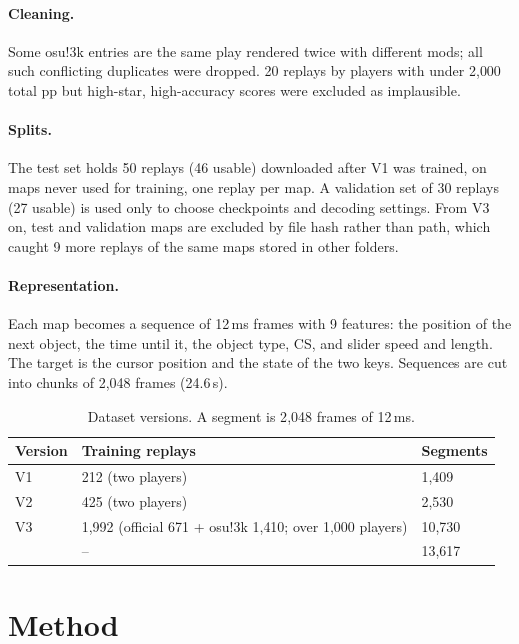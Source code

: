 \documentclass[11pt,a4paper]{article}
\begin{document}
\paragraph{Cleaning.} Some osu!3k entries are the same play rendered twice with different mods; all such
conflicting duplicates were dropped. 20 replays by players with under 2{,}000 total pp but high-star,
high-accuracy scores were excluded as implausible.

\paragraph{Splits.} The test set holds 50 replays (46 usable) downloaded after V1 was trained, on maps never
used for training, one replay per map. A validation set of 30 replays (27 usable) is used only to choose
checkpoints and decoding settings. From V3 on, test and validation maps are excluded by file hash rather than
path, which caught 9 more replays of the same maps stored in other folders.

\paragraph{Representation.} Each map becomes a sequence of 12\,ms frames with 9 features: the position of the
next object, the time until it, the object type, CS, and slider speed and length. The target is the cursor
position and the state of the two keys. Sequences are cut into chunks of 2{,}048 frames (24.6\,s).

\begin{table}[t]
\centering
\caption{Dataset versions. A segment is 2{,}048 frames of 12\,ms.}
\label{tab:data}
\begin{tabular}{lll}
\toprule
Version & Training replays & Segments \\
\midrule
V1 & 212 (two players) & 1{,}409 \\
V2 & 425 (two players) & 2{,}530 \\
V3 & 1{,}992 (official 671 + osu!3k 1{,}410; over 1{,}000 players) & 10{,}730 \\
\midrule
\citet{niooii} & -- & 13{,}617 \\
\bottomrule
\end{tabular}
\end{table}

\section{Method}
\end{document}
